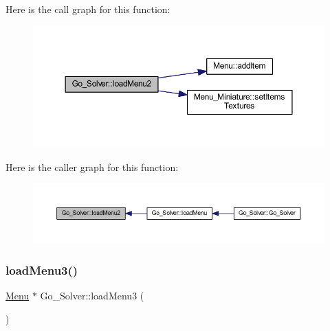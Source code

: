 Here is the call graph for this function\+:
\nopagebreak
\begin{figure}[H]
\begin{center}
\leavevmode
\includegraphics[width=350pt]{class_go___solver_acbb6d35d88e5c9bb05ceaae81db6287c_cgraph}
\end{center}
\end{figure}
Here is the caller graph for this function\+:
\nopagebreak
\begin{figure}[H]
\begin{center}
\leavevmode
\includegraphics[width=350pt]{class_go___solver_acbb6d35d88e5c9bb05ceaae81db6287c_icgraph}
\end{center}
\end{figure}
\mbox{\label{class_go___solver_a48def38f87effdb973b5f02329a0af4f}} 
\subsubsection{\texorpdfstring{load\+Menu3()}{loadMenu3()}}
{\footnotesize\ttfamily \hyperlink{class_menu}{Menu} $\ast$ Go\+\_\+\+Solver\+::load\+Menu3 (\begin{DoxyParamCaption}{ }\end{DoxyParamCaption})\hspace{0.3cm}{\ttfamily [static]}}

